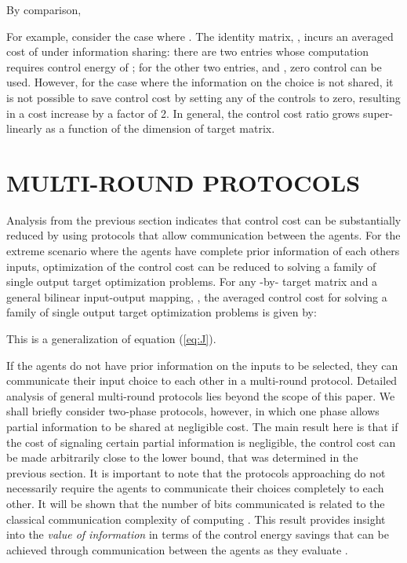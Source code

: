 \documentclass[12pt,onecolumn,draftcls]{IEEEtran}
\begin{document}
By comparison,


For example, consider the case where .  The
identity matrix, , incurs an averaged cost of  under information sharing:
there are two entries whose computation requires control energy of ; for the other
two entries,  and , zero control can be used.
However, for the case where the information on the choice is not shared,
it is not possible to save control cost by setting any of the controls to zero, resulting in a cost increase by a factor of 2.
In general, the control cost ratio grows super-linearly as a function of the dimension of target matrix.

\section{MULTI-ROUND PROTOCOLS}\setcounter{equation}{0}

Analysis from the previous section indicates that control cost can be substantially reduced by using protocols that allow communication between the agents.   For the extreme scenario where the agents have complete prior information of
each others inputs, optimization of the control cost can be reduced to solving a family of single output target optimization
problems.  For any -by- target matrix  and a general bilinear
input-output mapping, , the averaged control cost for solving a family of single
output target optimization problems is given by:

This is a generalization of equation (\ref{eq:J}).

If the agents do not have prior information on the inputs to be selected, they can
communicate their input choice to each other in a multi-round protocol.
Detailed analysis of general multi-round protocols lies beyond the scope of this paper.  We shall briefly consider two-phase protocols, however, in which one phase allows partial information to be shared at negligible cost.  The main result here is that if the cost of signaling certain partial information is negligible, the control cost can be made arbitrarily
close to the lower bound,  that was determined in the previous section.   It is important to note that the protocols approaching  do not necessarily
require the agents to communicate their choices completely to each other.  It will be shown that the number of bits communicated is related to the classical communication complexity of computing .  This result provides insight into the {\em value of information} in terms of the control energy savings that can be achieved through communication between the agents as they evaluate .
\end{document}
